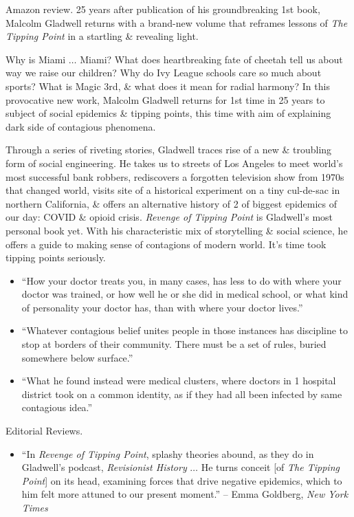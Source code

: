 \documentclass{article}
\begin{document}
\begin{enumerate}
	{\sf Amazon review.} 25 years after publication of his groundbreaking 1st book, {\sc Malcolm Gladwell} returns with a brand-new volume that reframes lessons of {\it The Tipping Point} in a startling \& revealing light.
	
	Why is Miami $\ldots$ Miami? What does heartbreaking fate of cheetah tell us about way we raise our children? Why do Ivy League schools care so much about sports? What is Magic 3rd, \& what does it mean for radial harmony? In this provocative new work, {\sc Malcolm Gladwell} returns for 1st time in 25 years to subject of social epidemics \& tipping points, this time with aim of explaining dark side of contagious phenomena.
	
	Through a series of riveting stories, {\sc Gladwell} traces rise of a new \& troubling form of social engineering. He takes us to streets of Los Angeles to meet world's most successful bank robbers, rediscovers a forgotten television show from 1970s that changed world, visits site of a historical experiment on a tiny cul-de-sac in northern California, \& offers an alternative history of 2 of biggest epidemics of our day: COVID \& opioid crisis. {\it Revenge of Tipping Point} is {\sc Gladwell}'s most personal book yet. With his characteristic mix of storytelling \& social science, he offers a guide to making sense of contagions of modern world. It's time took tipping points seriously.
	\begin{itemize}
		\item ``How your doctor treats you, in many cases, has less to do with where your doctor was trained, or how well he or she did in medical school, or what kind of personality your doctor has, than with where your doctor lives.''
		\item ``Whatever contagious belief unites people in those instances has discipline to stop at borders of their community. There must be a set of rules, buried somewhere below surface.''
		\item ``What he found instead were medical clusters, where doctors in 1 hospital district took on a common identity, as if they had all been infected by same contagious idea.''
	\end{itemize}
	{\sf Editorial Reviews.}
	\begin{itemize}
		\item ``In {\it Revenge of Tipping Point}, splashy theories abound, as they do in {\sc Gladwell}'s podcast, {\it Revisionist History} $\ldots$ He turns conceit [of {\it The Tipping Point}] on its head, examining forces that drive negative epidemics, which to him felt more attuned to our present moment.'' -- {\sc Emma Goldberg}, {\it New York Times}

\end{itemize}
\end{enumerate}
\end{document}
